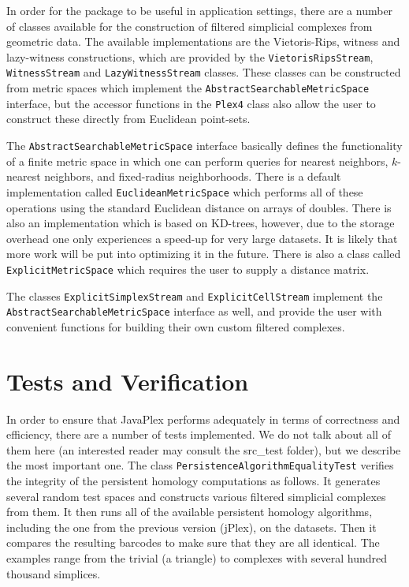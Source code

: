 In order for the package to be useful in application settings, there are a number of classes available for the construction of filtered simplicial complexes from geometric data. The available implementations are the Vietoris-Rips, witness and lazy-witness constructions, which are provided by the {\tt VietorisRipsStream}, {\tt WitnessStream} and {\tt LazyWitnessStream} classes. These classes can be constructed from metric spaces which implement the {\tt AbstractSearchableMetricSpace} interface, but the accessor functions in the {\tt Plex4} class also allow the user to construct these directly from Euclidean point-sets.

The {\tt AbstractSearchableMetricSpace} interface basically defines the functionality of a finite metric space in which one can perform queries for nearest neighbors, $k$-nearest neighbors, and fixed-radius neighborhoods. There is a default implementation called {\tt EuclideanMetricSpace} which performs all of these operations using the standard Euclidean distance on arrays of doubles. There is also an implementation which is based on KD-trees, however, due to the storage overhead one only experiences a speed-up for very large datasets. It is likely that more work will be put into optimizing it in the future. There is also a class called {\tt ExplicitMetricSpace} which requires the user to supply a distance matrix.

The classes {\tt ExplicitSimplexStream} and {\tt ExplicitCellStream} implement the {\tt Abstract\-Searchable\-Metric\-Space} interface as well, and provide the user with convenient functions for building their own custom filtered complexes.

\section{Tests and Verification}

In order to ensure that JavaPlex performs adequately in terms of correctness and efficiency, there are a number of tests implemented. We do not talk about all of them here (an interested reader may consult the src\_test folder), but we describe the most important one. The class {\tt Persistence\-Algorithm\-Equality\-Test} verifies the integrity of the persistent homology computations as follows. It generates several random test spaces and constructs various filtered simplicial complexes from them. It then runs all of the available persistent homology algorithms, including the one from the previous version (jPlex), on the datasets. Then it compares the resulting barcodes to make sure that they are all identical. The examples range from the trivial (a triangle) to complexes with several hundred thousand simplices.

